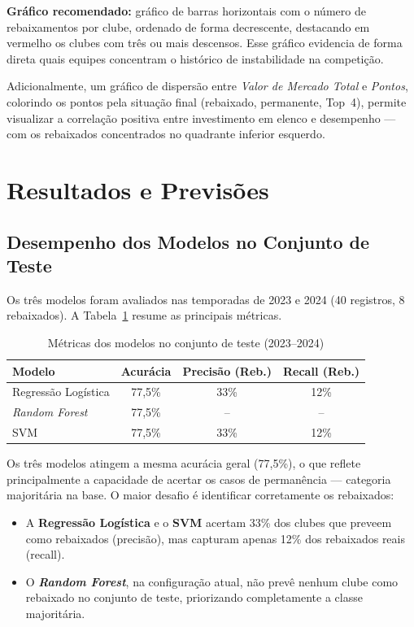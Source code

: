 \textbf{Gráfico recomendado:} gráfico de barras horizontais com o número de rebaixamentos
por clube, ordenado de forma decrescente, destacando em vermelho os clubes com três ou mais
descensos. Esse gráfico evidencia de forma direta quais equipes concentram o histórico de
instabilidade na competição.

Adicionalmente, um gráfico de dispersão entre \textit{Valor de Mercado Total} e
\textit{Pontos}, colorindo os pontos pela situação final (rebaixado, permanente, Top~4),
permite visualizar a correlação positiva entre investimento em elenco e desempenho
— com os rebaixados concentrados no quadrante inferior esquerdo.


\section{Resultados e Previsões}

\subsection{Desempenho dos Modelos no Conjunto de Teste}

Os três modelos foram avaliados nas temporadas de 2023 e 2024 (40 registros, 8 rebaixados).
A Tabela~\ref{tab:metricas} resume as principais métricas.

\begin{table}[H]
\centering
\caption{Métricas dos modelos no conjunto de teste (2023--2024)}
\label{tab:metricas}
\begin{tabular}{lccc}
\toprule
\textbf{Modelo} & \textbf{Acurácia} & \textbf{Precisão (Reb.)} & \textbf{Recall (Reb.)} \\
\midrule
Regressão Logística & 77,5\% & 33\% & 12\% \\
\textit{Random Forest}      & 77,5\% & --  & -- \\
SVM                 & 77,5\% & 33\% & 12\% \\
\bottomrule
\end{tabular}
\end{table}

Os três modelos atingem a mesma acurácia geral (77,5\%), o que reflete principalmente
a capacidade de acertar os casos de permanência — categoria majoritária na base.
O maior desafio é identificar corretamente os rebaixados:

\begin{itemize}
    \item A \textbf{Regressão Logística} e o \textbf{SVM} acertam 33\% dos clubes
          que preveem como rebaixados (precisão), mas capturam apenas 12\% dos
          rebaixados reais (recall).
    \item O \textbf{\textit{Random Forest}}, na configuração atual, não prevê nenhum
          clube como rebaixado no conjunto de teste, priorizando completamente
          a classe majoritária.
\end{itemize}

